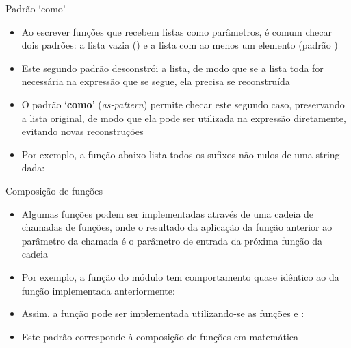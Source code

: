 \begin{frame}[fragile]{Padrão `como'}

    \begin{itemize}
        \item Ao escrever funções que recebem listas como parâmetros, é comum checar dois
            padrões: a lista vazia () e a lista com ao menos um elemento
            (padrão )

        \item Este segundo padrão desconstrói a lista, de modo que se a lista toda for necessária
            na expressão que se segue, ela precisa se reconstruída

        \item O padrão `\textbf{como}' (\textit{as-pattern}) permite checar este segundo caso, 
            preservando
            a lista original, de modo que ela pode ser utilizada na expressão diretamente, evitando
            novas reconstruções

        \item Por exemplo, a função abaixo lista todos os sufixos não nulos de uma string dada:


    \end{itemize}

\end{frame}

\begin{frame}[fragile]{Composição de funções}

    \begin{itemize}
        \item Algumas funções podem ser implementadas através de uma cadeia de chamadas de
            funções, onde o resultado da aplicação da função anterior ao parâmetro da chamada
            é o parâmetro de entrada da próxima função da cadeia

        \item Por exemplo, a função  do módulo 
            tem comportamento quase idêntico ao da função  implementada
            anteriormente:


        \item Assim, a função  pode ser implementada utilizando-se as
            funções  e :


        \item Este padrão corresponde à composição de funções em matemática

    \end{itemize}

\end{frame}

